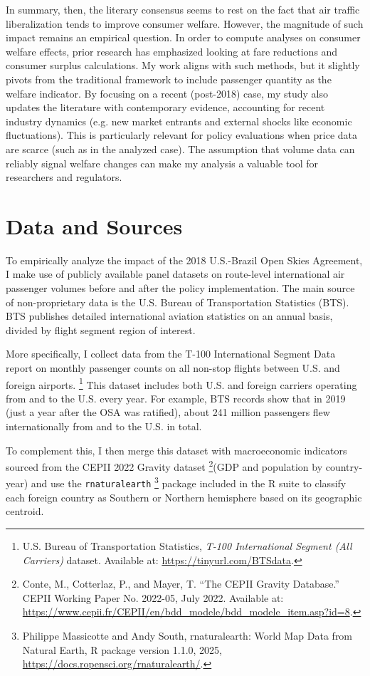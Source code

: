 \documentclass[12pt]{article}
\begin{document}
In summary, then, the literary consensus seems to rest on the fact that air traffic liberalization tends to improve consumer welfare. However, the magnitude of such impact remains an empirical question. In order to compute analyses on consumer welfare effects, prior research has emphasized looking at fare reductions and consumer surplus calculations. My work aligns with such methods, but it slightly pivots from the traditional framework to include passenger quantity as the welfare indicator. By focusing on a recent (post-2018) case, my study also updates the literature with contemporary evidence, accounting for recent industry dynamics (e.g. new market entrants and external shocks like economic fluctuations). This is particularly relevant for policy evaluations when price data are scarce (such as in the analyzed case). The assumption that volume data can reliably signal welfare changes can make my analysis a valuable tool for researchers and regulators.

\section{Data and Sources}

To empirically analyze the impact of the 2018 U.S.-Brazil Open Skies Agreement, I make use of publicly available panel datasets on route-level international air passenger volumes before and after the policy implementation. The main source of non-proprietary data is the U.S. Bureau of Transportation Statistics (BTS). BTS publishes detailed international aviation statistics on an annual basis, divided by flight segment region of interest. 

More specifically, I collect data from the T-100 International Segment Data report on monthly passenger counts on all non-stop flights between U.S. and foreign airports. \footnote{U.S. Bureau of Transportation Statistics, \textit{T-100 International Segment (All Carriers)} dataset. Available at: \url{https://tinyurl.com/BTSdata}.} This dataset includes both U.S. and foreign carriers operating from and to the U.S. every year. For example, BTS records show that in 2019 (just a year after the OSA was ratified), about 241 million passengers flew internationally from and to the U.S. in total. 

To complement this, I then merge this dataset with macroeconomic indicators sourced from the CEPII 2022 Gravity dataset
\footnote{Conte, M., Cotterlaz, P., and Mayer, T. “The CEPII Gravity Database.” CEPII Working Paper No. 2022-05, July 2022. Available at: \url{https://www.cepii.fr/CEPII/en/bdd_modele/bdd_modele_item.asp?id=8}.}(GDP and population by country-year) and use the \texttt{rnaturalearth} \footnote{Philippe Massicotte and Andy South, rnaturalearth: World Map Data from Natural Earth, R package version 1.1.0, 2025, \url{https://docs.ropensci.org/rnaturalearth/}.} package included in the R suite to classify each foreign country as Southern or Northern hemisphere based on its geographic centroid.
\end{document}
